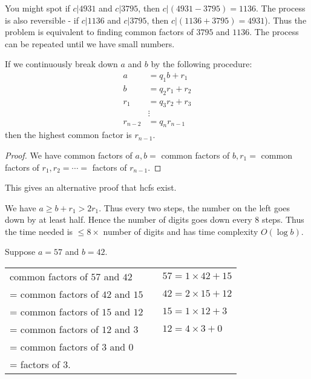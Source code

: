\documentclass[a4paper]{article}
\begin{document}
  You might spot if $c|4931$ and $c|3795$, then $c|(4931 - 3795)=1136$. The process is also reversible - if $c|1136$ and $c|3795$, then $c|(1136 + 3795) = 4931$). Thus the problem is equivalent to finding common factors of $3795$ and $1136$. The process can be repeated until we have small numbers.

  \begin{prop}
    If we continuously break down $a$ and $b$ by the following procedure: 
    \begin{align*}
      a &= q_1b + r_1\\
      b &= q_2r_1 + r_2\\
      r_1 &= q_3r_2 + r_3\\
      &\vdots\\
      r_{n-2} &= q_nr_{n-1}
    \end{align*}
    then the highest common factor is $r_{n-1}$.
  \end{prop}

  \begin{proof}
    We have common factors of $a, b=$ common factors of $b, r_1=$ common factors of $r_1, r_2 = \cdots = $ factors of $r_{n-1}$.
  \end{proof}
  \note This gives an alternative proof that hcfs exist.

  \note We have $a\geq b + r_1 > 2r_1$. Thus every two steps, the number on the left goes down by at least half. Hence the number of digits goes down every 8 steps. Thus the time needed is $\leq 8\times$ number of digits and has time complexity $O(\log b)$.

  \begin{eg}
    Suppose $a = 57$ and $b = 42$. \\
    \begin{tabular}{l l l}
      common factors of $57$ and $42$   &  & $57 = 1\times 42 + 15$ \\
      = common factors of $42$ and $15$ &  & $42 = 2\times 15 + 12$ \\
      = common factors of $15$ and $12$ &  & $15 = 1\times 12 + 3$  \\
      = common factors of $12$ and $3$  &  & $12 = 4\times 3 + 0$   \\
      = common factors of $3$ and $0$                               \\
      = factors of $3$.
    \end{tabular}
  \end{eg}
\end{document}
